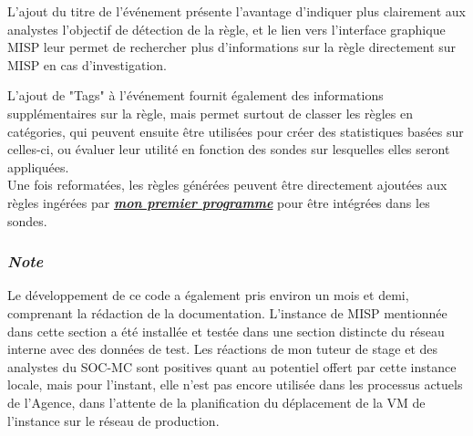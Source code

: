 \vspace{1em}

L'ajout du titre de l'événement présente l'avantage d'indiquer plus clairement aux analystes l'objectif de détection de la règle, et le lien vers l'interface graphique MISP leur permet de rechercher plus d'informations sur la règle directement sur MISP en cas d'investigation.\\ 

\newpage

L'ajout de "Tags" à l'événement fournit également des informations supplémentaires sur la règle, mais permet surtout de classer les règles en catégories, qui peuvent ensuite être utilisées pour créer des statistiques basées sur celles-ci, ou évaluer leur utilité en fonction des sondes sur lesquelles elles seront appliquées.\\

Une fois reformatées, les règles générées peuvent être directement ajoutées aux règles ingérées par \hyperref[chap3:section1]{\textbf{\textit{mon premier programme}}} pour être intégrées dans les sondes.

\vspace{1em}

\subsubsection{\textit{Note}}
Le développement de ce code a également pris environ un mois et demi, comprenant la rédaction de la documentation. L'instance de MISP mentionnée dans cette section a été installée et testée dans une section distincte du réseau interne avec des données de test. Les réactions de mon tuteur de stage et des analystes du SOC-MC sont positives quant au potentiel offert par cette instance locale, mais pour l'instant, elle n'est pas encore utilisée dans les processus actuels de l'Agence, dans l'attente de la planification du déplacement de la VM de l'instance sur le réseau de production.